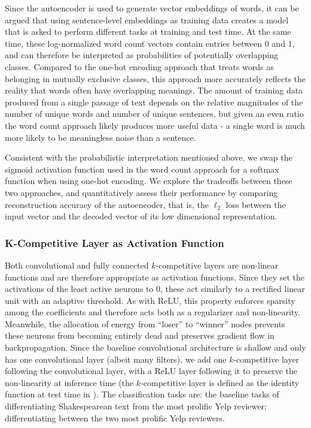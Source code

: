 \documentclass{vldb}
\begin{document}
Since the autoencoder is used to generate vector embeddings of words, it can be argued that using sentence-level embeddings as training data creates a model that is asked to perform different tasks at training and test time. At the same time, these log-normalized word count vectors contain entries between 0 and 1, and can therefore be interpreted as probabilities of potentially overlapping classes. Compared to the one-hot encoding approach that treats words as belonging in mutually exclusive classes, this approach more accurately reflects the reality that words often have overlapping meanings. The amount of training data produced from a single passage of text depends on the relative magnitudes of the number of unique words and number of unique sentences, but given an even ratio the word count approach likely produces more useful data - a single word is much more likely to be meaningless noise than a sentence.

Consistent with the probabilistic interpretation mentioned above, we swap the sigmoid activation function used in the word count approach for a softmax function when using one-hot encoding. We explore the tradeoffs between these two approaches, and quantitatively assess their performance by comparing reconstruction accuracy of the autoencoder, that is, the $\ell_2$ loss between the input vector and the decoded vector of its low dimensional representation.

\subsubsection{K-Competitive Layer as Activation Function}
Both convolutional and fully connected $k$-competitive layers are non-linear functions and are therefore appropriate as activation functions. Since they set the activations of the least active neurons to 0, these act similarly to a rectified linear unit with an adaptive threshold. As with ReLU, this property enforces sparsity among the coefficients and therefore acts both as a regularizer and non-linearity. Meanwhile, the allocation of energy from ``loser'' to ``winner'' nodes prevents these neurons from becoming entirely dead and preserves gradient flow in backpropagation. Since the baseline convolutional architecture is shallow and only has one convolutional layer (albeit many filters), we add one $k$-competitive layer following the convolutional layer, with a ReLU layer following it to preserve the non-linearity at inference time (the $k$-competitive layer is defined as the identity function at test time in \cite{KATE}). The classification tasks are: the baseline tasks of differentiating Shakespearean text from the most prolific Yelp reviewer; differentiating between the two most prolific Yelp reviewers.
\end{document}
